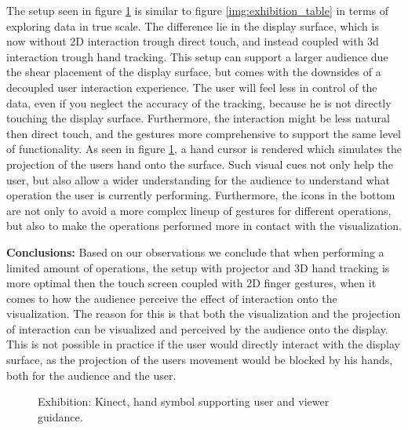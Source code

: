\documentclass[review,journal]{vgtc}         %
\begin{document}
The setup seen in figure \ref{img:exhibition_kinect} is similar to figure \ref{img:exhibition_table} in terms of exploring data in true scale. The difference lie in the display surface, which is now without 2D interaction trough direct touch, and instead coupled with 3d interaction trough hand tracking. This setup can support a larger audience due the shear placement of the display surface, but comes with the downsides of a decoupled user interaction experience. The user will feel less in control of the data, even if you neglect the accuracy of the tracking, because he is not directly touching the display surface. Furthermore, the interaction might be less natural then direct touch, and the gestures more comprehensive to support the same level of functionality. As seen in figure \ref{img:exhibition_kinect}, a hand cursor is rendered which simulates the projection of the users hand onto the surface. Such visual cues not only help the user, but also allow a wider understanding for the audience to understand what operation the user is currently performing. Furthermore, the icons in the bottom are not only to avoid a more complex lineup of gestures for different operations, but also to make the operations performed more in contact with the visualization.

\textbf{Conclusions:}
Based on our observations we conclude that when performing a limited amount of operations, the setup with projector and 3D hand tracking is more optimal then the touch screen coupled with 2D finger gestures, when it comes to how the audience perceive the effect of interaction onto the visualization. The reason for this is that both the visualization and the projection of interaction can be visualized and perceived by the audience onto the display. This is not possible in practice if the user would directly interact with the display surface, as the projection of the users movement would be blocked by his hands, both for the audience and the user.

\begin{figure}[htb]
	\centering
	\caption{Exhibition: Kinect, hand symbol supporting user and viewer guidance.}
	\label{img:exhibition_kinect}
\end{figure}
\end{document}
